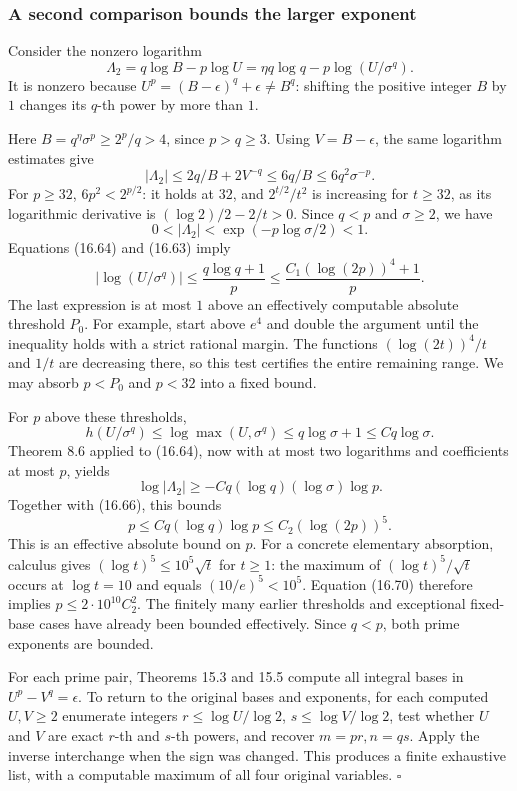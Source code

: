 \documentclass[
  11pt,
  a4paper,
]{article}
\begin{document}
\subsubsection{A second comparison bounds the larger
exponent}\label{a-second-comparison-bounds-the-larger-exponent}

Consider the nonzero logarithm \[
 \Lambda_2=q\log B-p\log U
          =\eta q\log q-p\log(U/\sigma^q).
 \tag{16.64}
\] It is nonzero because \(U^p=(B-\epsilon)^q+\epsilon\ne B^q\):
shifting the positive integer \(B\) by \(1\) changes its \(q\)-th power
by more than \(1\).

Here \(B=q^\eta\sigma^p\geq2^p/q>4\), since \(p>q\geq3\). Using
\(V=B-\epsilon\), the same logarithm estimates give \[
 |\Lambda_2|
 \leq2q/B+2V^{-q}
 \leq6q/B
 \leq6q^2\sigma^{-p}.
 \tag{16.65}
\] For \(p\geq32\), \(6p^2<2^{p/2}\): it holds at \(32\), and
\(2^{t/2}/t^2\) is increasing for \(t\geq32\), as its logarithmic
derivative is \((\log2)/2-2/t>0\). Since \(q<p\) and \(\sigma\geq2\), we
have \[
 0<|\Lambda_2|<\exp(-p\log\sigma/2)<1.
 \tag{16.66}
\] Equations (16.64) and (16.63) imply \[
 |\log(U/\sigma^q)|
 \leq\frac{q\log q+1}{p}
 \leq\frac{C_1(\log(2p))^4+1}{p}.
 \tag{16.67}
\] The last expression is at most \(1\) above an effectively computable
absolute threshold \(P_0\). For example, start above \(e^4\) and double
the argument until the inequality holds with a strict rational margin.
The functions \((\log(2t))^4/t\) and \(1/t\) are decreasing there, so
this test certifies the entire remaining range. We may absorb \(p<P_0\)
and \(p<32\) into a fixed bound.

For \(p\) above these thresholds, \[
 h(U/\sigma^q)\leq\log\max(U,\sigma^q)
                  \leq q\log\sigma+1\leq Cq\log\sigma.
 \tag{16.68}
\] Theorem 8.6 applied to (16.64), now with at most two logarithms and
coefficients at most \(p\), yields \[
 \log|\Lambda_2|
 \geq-Cq(\log q)(\log\sigma)\log p.
 \tag{16.69}
\] Together with (16.66), this bounds \[
 p\leq Cq(\log q)\log p
   \leq C_2(\log(2p))^5.
 \tag{16.70}
\] This is an effective absolute bound on \(p\). For a concrete
elementary absorption, calculus gives \((\log t)^5\leq10^5\sqrt t\) for
\(t\geq1\): the maximum of \((\log t)^5/\sqrt t\) occurs at
\(\log t=10\) and equals \((10/e)^5<10^5\). Equation (16.70) therefore
implies \(p\leq2\cdot10^{10}C_2^2\). The finitely many earlier
thresholds and exceptional fixed-base cases have already been bounded
effectively. Since \(q<p\), both prime exponents are bounded.

For each prime pair, Theorems 15.3 and 15.5 compute all integral bases
in \(U^p-V^q=\epsilon\). To return to the original bases and exponents,
for each computed \(U,V\geq2\) enumerate integers \(r\leq\log U/\log2\),
\(s\leq\log V/\log2\), test whether \(U\) and \(V\) are exact \(r\)-th
and \(s\)-th powers, and recover \(m=pr,n=qs\). Apply the inverse
interchange when the sign was changed. This produces a finite exhaustive
list, with a computable maximum of all four original variables.
\(\square\)
\end{document}
